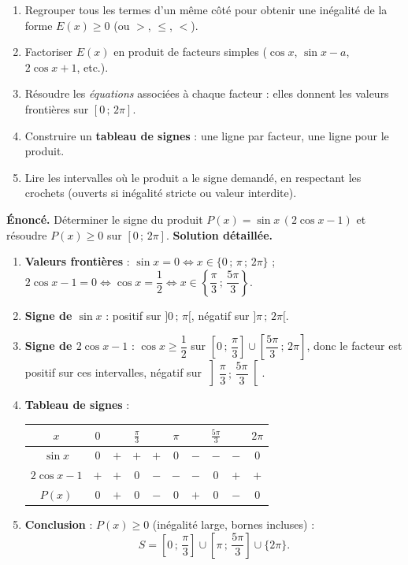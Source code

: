 \documentclass[11pt]{article}
\begin{document}
\begin{methode}
\begin{enumerate}
\item Regrouper tous les termes d'un même côté pour obtenir une inégalité de la forme $E(x) \geq 0$ (ou $>$, $\leq$, $<$).
\item Factoriser $E(x)$ en produit de facteurs simples ($\cos x$, $\sin x - a$, $2\cos x + 1$, etc.).
\item Résoudre les \emph{équations} associées à chaque facteur : elles donnent les valeurs frontières sur $[0\,;\,2\pi]$.
\item Construire un \textbf{tableau de signes} : une ligne par facteur, une ligne pour le produit.
\item Lire les intervalles où le produit a le signe demandé, en respectant les crochets (ouverts si inégalité stricte ou valeur interdite).
\end{enumerate}
\end{methode}

\begin{exoresolu}
\textbf{Énoncé.} Déterminer le signe du produit $P(x) = \sin x\,(2\cos x - 1)$ et résoudre $P(x) \geq 0$ sur $[0\,;\,2\pi]$.
\tcblower
\textbf{Solution détaillée.}
\begin{enumerate}
\item \textbf{Valeurs frontières} : $\sin x = 0 \iff x \in \{0\,;\,\pi\,;\,2\pi\}$ ; \quad $2\cos x - 1 = 0 \iff \cos x = \dfrac{1}{2} \iff x \in \left\{\dfrac{\pi}{3}\,;\,\dfrac{5\pi}{3}\right\}$.
\item \textbf{Signe de $\sin x$} : positif sur $]0\,;\,\pi[$, négatif sur $]\pi\,;\,2\pi[$.
\item \textbf{Signe de $2\cos x - 1$} : $\cos x \geq \dfrac{1}{2}$ sur $\left[0\,;\,\dfrac{\pi}{3}\right] \cup \left[\dfrac{5\pi}{3}\,;\,2\pi\right]$, donc le facteur est positif sur ces intervalles, négatif sur $\left]\dfrac{\pi}{3}\,;\,\dfrac{5\pi}{3}\right[$.
\item \textbf{Tableau de signes} :
\begin{center}
\begin{tabular}{|c|ccccccccc|}\hline
$x$ & $0$ & & $\frac{\pi}{3}$ & & $\pi$ & & $\frac{5\pi}{3}$ & & $2\pi$ \\ \hline
$\sin x$ & $0$ & $+$ & $+$ & $+$ & $0$ & $-$ & $-$ & $-$ & $0$ \\ \hline
$2\cos x - 1$ & $+$ & $+$ & $0$ & $-$ & $-$ & $-$ & $0$ & $+$ & $+$ \\ \hline
$P(x)$ & $0$ & $+$ & $0$ & $-$ & $0$ & $+$ & $0$ & $-$ & $0$ \\ \hline
\end{tabular}
\end{center}
\item \textbf{Conclusion} : $P(x) \geq 0$ (inégalité large, bornes incluses) :
\[ S = \left[0\,;\,\dfrac{\pi}{3}\right] \cup \left[\pi\,;\,\dfrac{5\pi}{3}\right] \cup \{2\pi\}. \]
\end{enumerate}
\end{exoresolu}
\end{document}

